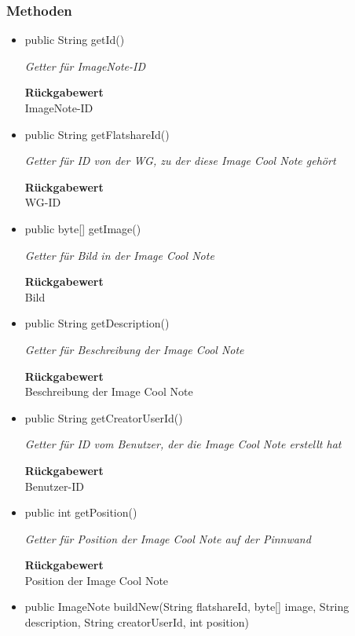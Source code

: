 \documentclass[a4paper]{scrreprt}
\begin{document}
    \subsubsection{Methoden}
    \begin{itemize}
    	\item{public String getId()}
    	
    	\textit{Getter für ImageNote-ID}
    	
    	
    	
    	\textbf{Rückgabewert} \\
    	ImageNote-ID        \item{public String getFlatshareId()}
    	
    	\textit{Getter für ID von der WG, zu der diese Image Cool Note gehört}
    	
    	
    	
    	\textbf{Rückgabewert} \\
    	WG-ID        \item{public byte[] getImage()}
    	
    	\textit{Getter für Bild in der Image Cool Note}
    	
    	
    	
    	\textbf{Rückgabewert} \\
    	Bild        \item{public String getDescription()}
    	
    	\textit{Getter für Beschreibung der Image Cool Note}
    	
    	
    	
    	\textbf{Rückgabewert} \\
    	Beschreibung der Image Cool Note        \item{public String getCreatorUserId()}
    	
    	\textit{Getter für ID vom Benutzer, der die Image Cool Note erstellt hat}
    	
    	
    	
    	\textbf{Rückgabewert} \\
    	Benutzer-ID        \item{public int getPosition()}
    	
    	\textit{Getter für Position der Image Cool Note auf der Pinnwand}
    	
    	
    	
    	\textbf{Rückgabewert} \\
    	Position der Image Cool Note        \item{public ImageNote buildNew(String flatshareId, byte[] image, String description, String creatorUserId, int position)}
    	

\end{itemize}
\end{document}
